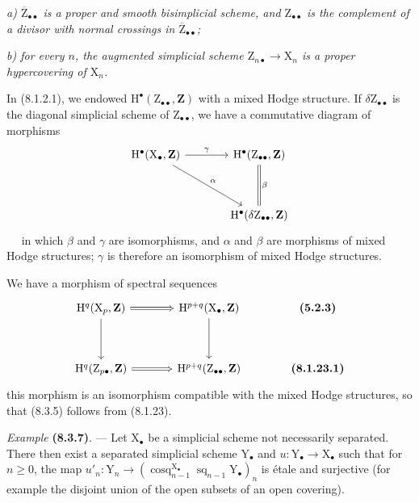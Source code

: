 \documentclass[11pt,leqno]{article}
\newcommand{\Page}[1]{\ifvmode\noindent\else\unskip\ \fi{\footnotesize\textcolor{gray}{[p.\,#1]}}\ \ignorespaces}
\begin{document}
\textit{a) \(\overline{\mathrm{Z}}_{\bullet\bullet}\) is a proper and smooth bisimplicial scheme, and \(\mathrm{Z}_{\bullet\bullet}\) is the complement of a divisor with normal crossings in \(\overline{\mathrm{Z}}_{\bullet\bullet}\);}

\textit{b) for every \(n\), the augmented simplicial scheme \(\mathrm{Z}_{n\bullet}\to\mathrm{X}_n\) is a proper hypercovering of \(\mathrm{X}_n\).}

In (8.1.2.1), we endowed \(\mathrm{H}^\bullet(\mathrm{Z}_{\bullet\bullet},\mathbf{Z})\) with a mixed Hodge structure. If \(\delta\mathrm{Z}_{\bullet\bullet}\) is the diagonal simplicial scheme of \(\mathrm{Z}_{\bullet\bullet}\), we have a commutative diagram of morphisms
\[
\begin{tikzcd}[column sep=large,row sep=huge]
\mathrm{H}^\bullet(\mathrm{X}_\bullet,\mathbf{Z})
  \arrow[r,"\gamma"] \arrow[dr,"\alpha"]
 & \mathrm{H}^\bullet(\mathrm{Z}_{\bullet\bullet},\mathbf{Z})
   \arrow[d,equal,"\beta"]\\
 & \mathrm{H}^\bullet(\delta\mathrm{Z}_{\bullet\bullet},\mathbf{Z})
\end{tikzcd}
\]
\Page{43}
in which \(\beta\) and \(\gamma\) are isomorphisms, and \(\alpha\) and \(\beta\) are morphisms of mixed Hodge structures; \(\gamma\) is therefore an isomorphism of mixed Hodge structures.

We have a morphism of spectral sequences
\[
\begin{tikzcd}[column sep=large,row sep=huge]
\mathrm{H}^q(\mathrm{X}_p,\mathbf{Z})
  \arrow[r,Rightarrow] \arrow[d]
 & \mathrm{H}^{p+q}(\mathrm{X}_\bullet,\mathbf{Z}) \arrow[d]
 & \text{\textbf{(5.2.3)}}\\
\mathrm{H}^q(\mathrm{Z}_{p\bullet},\mathbf{Z})
  \arrow[r,Rightarrow]
 & \mathrm{H}^{p+q}(\mathrm{Z}_{\bullet\bullet},\mathbf{Z})
 & \text{\textbf{(8.1.23.1)}}
\end{tikzcd}
\]
this morphism is an isomorphism compatible with the mixed Hodge structures, so that (8.3.5) follows from (8.1.23).

\textit{Example} \textbf{(8.3.7)}. — Let \(\mathrm{X}_\bullet\) be a simplicial scheme not necessarily separated. There then exist a separated simplicial scheme \(\mathrm{Y}_\bullet\) and \(u:\mathrm{Y}_\bullet\to\mathrm{X}_\bullet\) such that for \(n\geq0\), the map \(u'_n:\mathrm{Y}_n\to(\operatorname{cosq}_{n-1}^{\mathrm{X}_\bullet}\operatorname{sq}_{n-1}\mathrm{Y}_\bullet)_n\) is étale and surjective (for example the disjoint union of the open subsets of an open covering).
\end{document}
